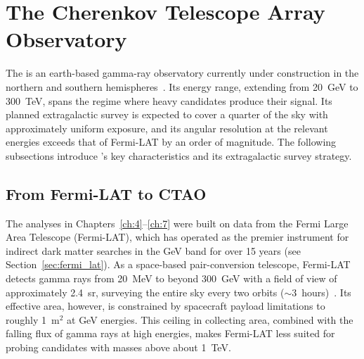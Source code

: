 
\section{The Cherenkov Telescope Array Observatory}
\label{sec:8.3}

The \CTAO is an earth-based gamma-ray observatory currently under construction in the northern and southern hemispheres~\cite{CTAConsortium:2017dvg}.
Its energy range, extending from 20~GeV to 300~TeV, spans the regime where heavy \WIMP candidates produce their signal. Its planned extragalactic survey is expected to cover a quarter of the sky with approximately uniform exposure, and its angular resolution at the relevant energies exceeds that of Fermi-LAT by an order of magnitude.
The following subsections introduce \CTAO's key characteristics and its extragalactic survey strategy.

\subsection{From Fermi-LAT to CTAO}
\label{sec:8.3.1}

The analyses in Chapters~\ref{ch:4}--\ref{ch:7} were built on data from the Fermi Large Area Telescope (Fermi-LAT), which has operated as the premier instrument for indirect dark matter searches in the GeV band for over 15 years (see Section~\ref{sec:fermi_lat}). As a space-based pair-conversion telescope, Fermi-LAT detects gamma rays from 20~MeV to beyond 300~GeV with a field of view of approximately 2.4~sr, surveying the entire sky every two orbits ($\sim 3$~hours)~\cite{Atwood:2009ez}.
Its effective area, however, is constrained by spacecraft payload limitations to roughly 1~m$^2$ at GeV energies.
This ceiling in collecting area, combined with the falling flux of gamma rays at high energies, makes Fermi-LAT less suited for probing \WIMP candidates with masses above about 1~TeV.

